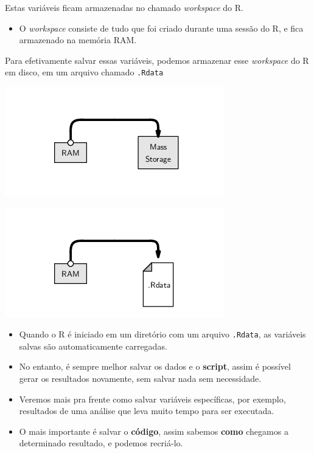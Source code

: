 \documentclass[10pt,a4paper]{book}
\providecommand{\tightlist}{%
  \setlength{\itemsep}{0pt}\setlength{\parskip}{0pt}}
\begin{document}
Estas variáveis ficam armazenadas no chamado \emph{workspace} do R.

\begin{itemize}
\tightlist
\item
  O \emph{workspace} consiste de tudo que foi criado durante uma sessão
  do R, e fica armazenado na memória RAM.
\end{itemize}

Para efetivamente salvar essas variáveis, podemos armazenar esse
\emph{workspace} do R em disco, em um arquivo chamado \texttt{.Rdata}

\begin{center}\includegraphics[width=0.5\linewidth]{img/script-workspace} \end{center}

\begin{center}\includegraphics[width=0.5\linewidth]{img/script-workspacedata} \end{center}

\begin{itemize}
\tightlist
\item
  Quando o R é iniciado em um diretório com um arquivo \texttt{.Rdata},
  as variáveis salvas são automaticamente carregadas.
\item
  No entanto, é sempre melhor salvar os dados e o \textbf{script}, assim
  é possível gerar os resultados novamente, sem salvar nada sem
  necessidade.
\item
  Veremos mais pra frente como salvar variáveis específicas, por
  exemplo, resultados de uma análise que leva muito tempo para ser
  executada.
\item
  O mais importante é salvar o \textbf{código}, assim sabemos
  \textbf{como} chegamos a determinado resultado, e podemos recriá-lo.
\end{itemize}
\end{document}
